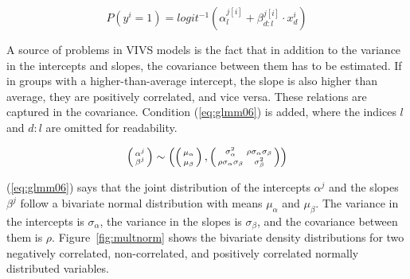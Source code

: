 \documentclass[a4paper,12pt]{article}
\begin{document}
\begin{equation}
  P(y^i=1)=logit^{-1}(\alpha_{l}^{j[i]}+\beta_{d:l}^{j[i]}\cdot x_d^i)
  \label{eq:glmm05}
\end{equation}

A source of problems in VIVS models is the fact that in addition to the variance in the intercepts and slopes, the covariance between them has to be estimated.
If in groups with a higher-than-average intercept, the slope is also higher than average, they are positively correlated, and vice versa.
These relations are captured in the covariance.
Condition (\ref{eq:glmm06}) is added, where the indices $l$ and $d:l$ are omitted for readability.

\begin{equation} 
  \left( \begin{smallmatrix} \alpha^j \\ \beta^j \end{smallmatrix}\right) \sim
    \left(
    \left( \begin{smallmatrix} \mu_{\alpha}\vphantom{\beta^j} \\ \mu_{\beta}\vphantom{\beta^j} \end{smallmatrix} \right), 
      \left( \begin{smallmatrix} \sigma_{\alpha}^2 & \rho\sigma_{\alpha}\sigma_{\beta} \\
	\rho\sigma_{\alpha}\sigma_{\beta} & \sigma_{\beta}^2 \end{smallmatrix} \right)
    \right)
  \label{eq:glmm06}
\end{equation}

(\ref{eq:glmm06}) says that the joint distribution of the intercepts $\alpha^j$ and the slopes $\beta^j$ follow a bivariate normal distribution with means $\mu_{\alpha}$ and $\mu_{\beta}$.
The variance in the intercepts is $\sigma_{\alpha}$, the variance in the slopes is $\sigma_{\beta}$, and the covariance between them is $\rho$.
Figure~\ref{fig:multnorm} shows the bivariate density distributions for two negatively correlated, non-correlated, and positively correlated normally distributed variables.
\end{document}
